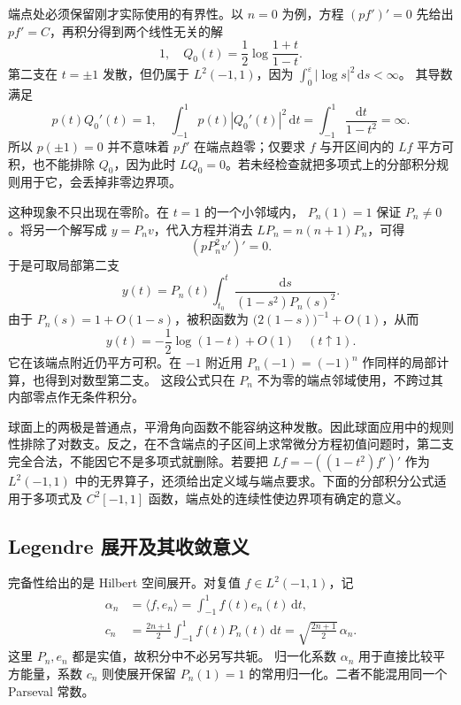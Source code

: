 \ProseParagraphBreak

端点处必须保留刚才实际使用的有界性。以 \(n=0\) 为例，方程
\((pf')'=0\) 先给出 \(pf'=C\)，再积分得到两个线性无关的解
\[
 1,\quad
 Q_0(t)=\frac12\log\frac{1+t}{1-t}.
\]
第二支在 \(t=\pm1\) 发散，但仍属于 \(L^2(-1,1)\)，因为
\(\int_0^\varepsilon|\log s|^2\,\mathrm ds<\infty\)。
其导数满足
\[
 p(t)Q_0'(t)=1,\quad
 \int_{-1}^1p(t)|Q_0'(t)|^2\,\mathrm dt
 =\int_{-1}^1\frac{\mathrm dt}{1-t^2}=\infty.
\]
所以 \(p(\pm1)=0\) 并不意味着 \(pf'\) 在端点趋零；仅要求
\(f\) 与开区间内的 \(Lf\) 平方可积，也不能排除 \(Q_0\)，因为此时
\(LQ_0=0\)。若未经检查就把多项式上的分部积分规则用于它，会丢掉非零边界项。

\ProseParagraphBreak

这种现象不只出现在零阶。在 \(t=1\) 的一个小邻域内，
\(P_n(1)=1\) 保证 \(P_n\ne0\)。将另一个解写成
\(y=P_nv\)，代入方程并消去 \(LP_n=n(n+1)P_n\)，可得
\[
 (pP_n^2v')'=0.
\]
于是可取局部第二支
\[
 y(t)=P_n(t)\int_{t_0}^t
          \frac{\mathrm ds}{(1-s^2)P_n(s)^2}.
\]
由于 \(P_n(s)=1+O(1-s)\)，被积函数为
\(\bigl(2(1-s)\bigr)^{-1}+O(1)\)，从而
\[
 y(t)=-\frac12\log(1-t)+O(1)
 \quad(t\uparrow1).
\]
它在该端点附近仍平方可积。在 \(-1\) 附近用
\(P_n(-1)=(-1)^n\) 作同样的局部计算，也得到对数型第二支。
这段公式只在 \(P_n\) 不为零的端点邻域使用，不跨过其内部零点作无条件积分。

\ProseParagraphBreak

球面上的两极是普通点，平滑角向函数不能容纳这种发散。因此球面应用中的规则性排除了对数支。反之，在不含端点的子区间上求常微分方程初值问题时，第二支完全合法，不能因它不是多项式就删除。若要把
\(Lf=-((1-t^2)f')'\) 作为 \(L^2(-1,1)\) 中的无界算子，还须给出定义域与端点要求。下面的分部积分公式适用于多项式及 \(C^2[-1,1]\) 函数，端点处的连续性使边界项有确定的意义。

\subsection{Legendre 展开及其收敛意义}
\label{b2:subsec:B20203}

完备性给出的是 Hilbert 空间展开。对复值
\(f\in L^2(-1,1)\)，记
\[
\begin{aligned}
 \alpha_n&=\langle f,e_n\rangle
       =\int_{-1}^1f(t)e_n(t)\,\mathrm dt,\\
 c_n&=\frac{2n+1}{2}\int_{-1}^1f(t)P_n(t)\,\mathrm dt
       =\sqrt{\frac{2n+1}{2}}\,\alpha_n.
\end{aligned}
\]
这里 \(P_n,e_n\) 都是实值，故积分中不必另写共轭。
归一化系数 \(\alpha_n\) 用于直接比较平方能量，系数
\(c_n\) 则使展开保留 \(P_n(1)=1\) 的常用归一化。二者不能混用同一个 Parseval 常数。

